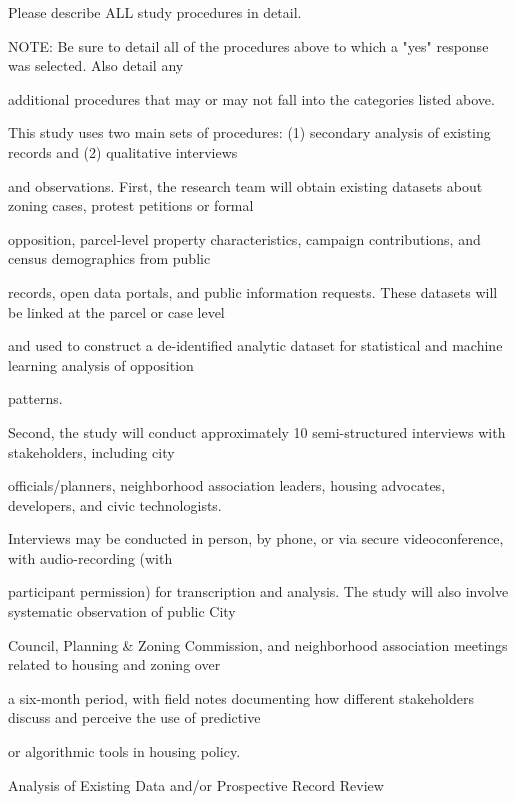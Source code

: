 \documentclass[10pt, letterpaper]{article}
\begin{document}
\begin{responsebox}

Please describe ALL study procedures in detail.

NOTE: Be sure to detail all of the procedures above to which a "yes" response was selected. Also detail any

additional procedures that may or may not fall into the categories listed above.

\vspace{0.5em}

\vspace{0.5em}

This study uses two main sets of procedures: (1) secondary analysis of existing records and (2) qualitative interviews

and observations. First, the research team will obtain existing datasets about zoning cases, protest petitions or formal

opposition, parcel-level property characteristics, campaign contributions, and census demographics from public

records, open data portals, and public information requests. These datasets will be linked at the parcel or case level

and used to construct a de-identified analytic dataset for statistical and machine learning analysis of opposition

patterns.

\vspace{0.5em}

\vspace{0.5em}

Second, the study will conduct approximately 10 semi-structured interviews with stakeholders, including city

officials/planners, neighborhood association leaders, housing advocates, developers, and civic technologists.

Interviews may be conducted in person, by phone, or via secure videoconference, with audio-recording (with

participant permission) for transcription and analysis. The study will also involve systematic observation of public City

Council, Planning \& Zoning Commission, and neighborhood association meetings related to housing and zoning over

a six-month period, with field notes documenting how different stakeholders discuss and perceive the use of predictive

or algorithmic tools in housing policy.

\vspace{0.5em}

\vspace{0.5em}

\vspace{0.5em}

Analysis of Existing Data and/or Prospective Record Review

\vspace{0.5em}

\end{responsebox}
\end{document}
